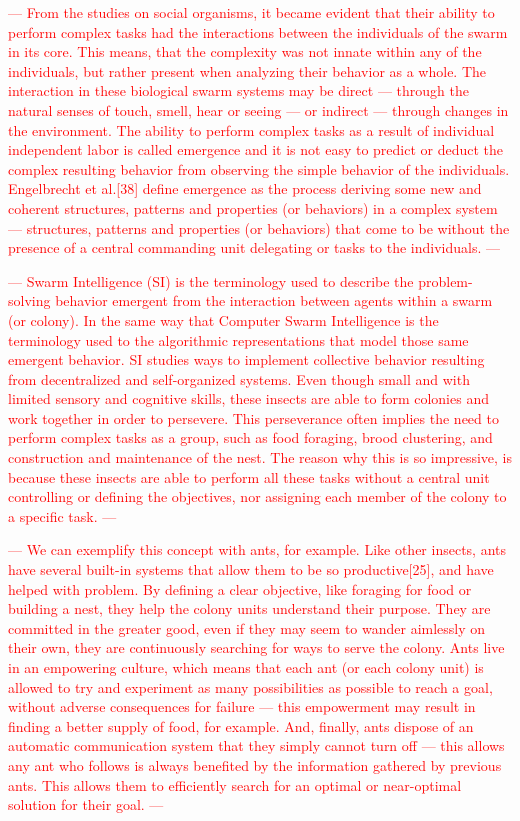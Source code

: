 \textcolor{red}{---
From the studies on social organisms, it became evident that their ability to perform complex tasks had the interactions between the individuals of the swarm in its core. 
This means, that the complexity was not innate within any of the individuals, 
but rather present when analyzing their behavior as a whole.
The interaction in these biological swarm systems may be direct — through the natural senses of touch,
smell, hear or seeing — or indirect — through changes in the environment. 
The ability to perform complex tasks as a result of individual independent labor is called emergence and it is not easy to predict or deduct the complex resulting behavior from observing the simple behavior of the individuals. 
Engelbrecht et al.[38] define emergence as the process deriving some new and coherent structures, patterns and properties (or behaviors) in a complex system — 
structures, patterns and properties (or behaviors)
that come to be without the presence of a central commanding unit delegating or tasks to the individuals.
---}


\textcolor{red}{---
Swarm Intelligence (SI) is the terminology used to describe the problem-solving behavior emergent from the interaction between agents within a swarm (or colony). 
In the same way that Computer Swarm Intelligence is the terminology used to the algorithmic representations that model those same emergent behavior.
SI studies ways to implement collective behavior resulting from decentralized and self-organized systems. 
Even though small and with limited sensory and cognitive skills, 
these insects are able to form colonies and work together in order to persevere. 
This perseverance often implies the need to perform complex tasks as a group, 
such as food foraging, brood clustering, and construction and maintenance of the nest. 
The reason why this is so impressive, 
is because these insects are able to perform all these tasks without a central unit controlling or defining the objectives, 
nor assigning each member of the colony to a specific task.
---}

\textcolor{red}{---
We can exemplify this concept with ants, for example. 
Like other insects, ants have several built-in systems that allow them to be so productive[25], and have helped with problem. 
By defining a clear objective, 
like foraging for food or building a nest, 
they help the colony units understand their purpose.
They are committed in the greater good, 
even if they may seem to wander aimlessly on their own, 
they are continuously searching for ways to serve the colony. 
Ants live in an empowering culture, 
which means that each ant (or each colony unit) is allowed to try and experiment as many possibilities as possible to reach a goal, 
without adverse consequences for failure — this empowerment may result in finding a better supply of food, for example. 
And, finally, ants dispose of an automatic communication system that they simply cannot turn off — 
this allows any ant who follows is always benefited by the information gathered by previous ants. 
This allows them to efficiently search for an optimal or near-optimal solution for their goal.
---}

